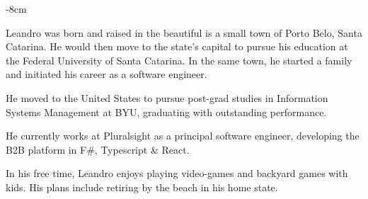 \documentclass[10pt,a4paper]{altacv}
\begin{document}

\begin{adjustwidth}{}{-8cm}
\makecvheader

\par Leandro was born and raised in the beautiful is a small town of Porto Belo, Santa Catarina. He would then move to the state's capital to pursue his education at the Federal University of Santa Catarina. In the same town, he started a family and initiated his career as a software engineer.

\par He moved to the United States to pursue post-grad studies in Information Systems Management at BYU, graduating with outstanding performance.

\par He currently works at Pluralsight as a principal software engineer, developing the B2B platform in F\#, Typescript \& React.

\par In his free time, Leandro enjoys playing video-games and backyard games with kids. His plans include retiring by the beach in his home state.

\end{adjustwidth}

\clearpage
\end{document}
